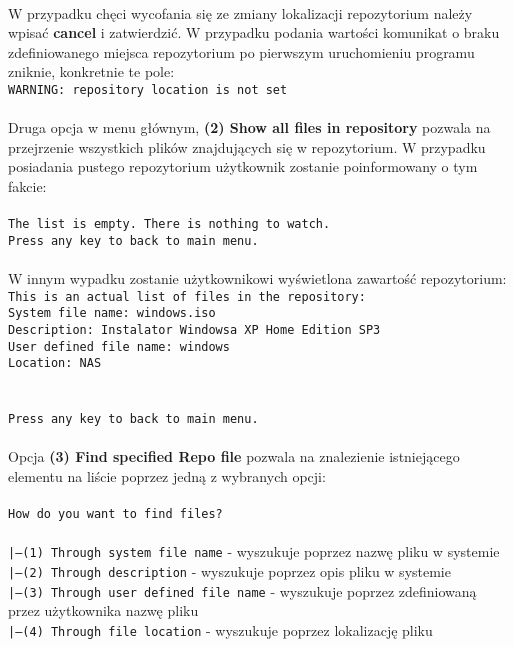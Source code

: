 \documentclass[10pt, a4paper]{article}
\begin{document}
\\
W przypadku chęci wycofania się ze zmiany lokalizacji repozytorium należy wpisać \textbf{cancel} i zatwierdzić. W przypadku podania wartości komunikat o braku zdefiniowanego miejsca repozytorium po pierwszym uruchomieniu programu zniknie, konkretnie te pole:\\
\texttt{WARNING: repository location is not set}\\
\\
Druga opcja w menu głównym, \textbf{(2) Show all files in repository} pozwala na przejrzenie wszystkich plików znajdujących się w repozytorium. W przypadku posiadania pustego repozytorium użytkownik zostanie poinformowany o tym fakcie:\\
\\
\texttt{The list is empty. There is nothing to watch.\\
Press any key to back to main menu.}\\
\\
W innym wypadku zostanie użytkownikowi wyświetlona zawartość repozytorium:\\
\texttt{This is an actual list of files in the repository:\\
System file name: windows.iso\\
Description: Instalator Windowsa XP Home Edition SP3\\
User defined file name: windows\\
Location: NAS\\
\\
\\
Press any key to back to main menu.}\\
\\
Opcja \textbf{(3) Find specified Repo file} pozwala na znalezienie istniejącego elementu na liście poprzez jedną z wybranych opcji:\\
\\
\texttt{How do you want to find files?}\\
\\
\texttt{|---(1) Through system file name} - wyszukuje poprzez nazwę pliku w systemie\\
\texttt{|---(2) Through description} - wyszukuje poprzez opis pliku w systemie\\
\texttt{|---(3) Through user defined file name} - wyszukuje poprzez zdefiniowaną przez użytkownika nazwę pliku\\
\texttt{|---(4) Through file location} - wyszukuje poprzez lokalizację pliku\\
\end{document}

